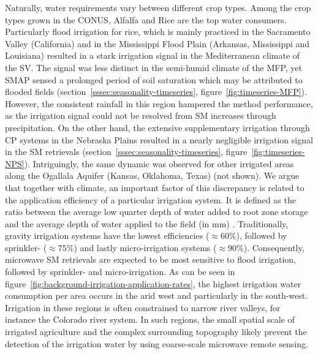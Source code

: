 \documentclass[hess, manuscript]{copernicus}
\begin{document}
\begin{enumerate}
Naturally, water requirements vary between different crop types. Among the crop types grown in the CONUS, Alfalfa and Rice are the top water consumers. Particularly flood irrigation for rice, which is mainly practiced in the Sacramento Valley (California) and in the Mississippi Flood Plain (Arkansas, Mississippi and Louisiana) \citep{nass2012census} resulted in a stark irrigation signal in the Mediterranean climate of the SV. The signal was less distinct in the semi-humid climate of the MFP, yet SMAP sensed a prolonged period of soil saturation which may be attributed to flooded fields (section~\ref{sssec:seasonality-timeseries}, figure~\ref{fig:timeseries-MFP}). However, the consistent rainfall in this region hampered the method performance, as the irrigation signal could not be resolved from SM increases through precipitation. On the other hand, the extensive supplementary irrigation through CP systems in the Nebraska Plains resulted in a nearly negligible irrigation signal in the SM retrievals (section~\ref{sssec:seasonality-timeseries}, figure~\ref{fig:timeseries-NPS}). Intriguingly, the same dynamic was observed for other irrigated areas along the Ogallala Aquifer (Kansas, Oklahoma, Texas) (not shown). We argue that together with climate, an important factor of this discrepancy is related to the application efficiency of a particular irrigation system. It is defined as the ratio between the average low quarter depth of water added to root zone storage and the average depth of water applied to the field (in mm) \citep{pereira2002irrigation}. Traditionally, gravity irrigation systems have the lowest efficiencies ($\approx 60\%$), followed by sprinkler- ($\approx 75\%$) and lastly micro-irrigation systems ($\approx 90\%$). Consequently, microwave SM retrievals are expected to be most sensitive to flood irrigation, followed by sprinkler- and micro-irrigation. As can be seen in figure~\ref{fig:background-irrigation-application-rates}, the highest irrigation water consumption per area occurs in the arid west and particularly in the south-west. Irrigation in these regions is often constrained to narrow river valleys, for instance the Colorado river system. In such regions, the small spatial scale of irrigated agriculture and the complex surrounding topography likely prevent the detection of the irrigation water by using coarse-scale microwave remote sensing. 
\end{enumerate}
\end{document}
